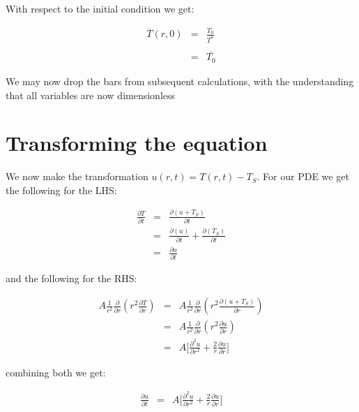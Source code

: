 \documentclass{report}
\begin{document}
With respect to the initial condition we get:\bigskip

\begin{eqnarray*} 
\overline{T}(r, 0) & = & \frac{T_0}{T^*} \\\\
                   & = & \overline{T_0}
\end{eqnarray*}\medskip

We may now drop the bars from subsequent calculations, with the understanding that all variables are now 
dimensionless



\section{Transforming the equation}

We now make the transformation $u(r, t) = T(r, t) - T_S$. For our PDE we get the following for the LHS:\bigskip

\begin{eqnarray*} 
              \frac{\partial T}{\partial t} & = & \frac{\partial (u + T_S)}{\partial t} \\
                                            & = & \frac{\partial (u)}{\partial t} + \frac{\partial (T_S)}{\partial t} \\
                                            & = & \frac{\partial u}{\partial t} 
\end{eqnarray*}\medskip

and the following for the RHS:\bigskip

\begin{eqnarray*} 
A \frac{1}{r^2} \frac{\partial}{\partial r} \left( r^2 \frac{\partial T}{\partial r} \right) 
& = & A \frac{1}{r^2} \frac{\partial}{\partial r} \left( r^2 \frac{\partial (u + T_S)}{\partial r} \right) \\
& = & A \frac{1}{r^2} \frac{\partial}{\partial r} \left( r^2 \frac{\partial u}{\partial r} \right) \\
& = & A \Bigg[  \frac{\partial^2 u}{\partial r^2} + \frac{2}{r} \frac{\partial u}{\partial r} \Bigg] 
\end{eqnarray*}\medskip

combining both we get:\bigskip

\begin{eqnarray*} 
\frac{\partial u}{\partial t} & = & A \Bigg[  \frac{\partial^2 u}{\partial r^2} + \frac{2}{r} \frac{\partial u}{\partial r} \Bigg] 
\end{eqnarray*}\medskip
\end{document}
